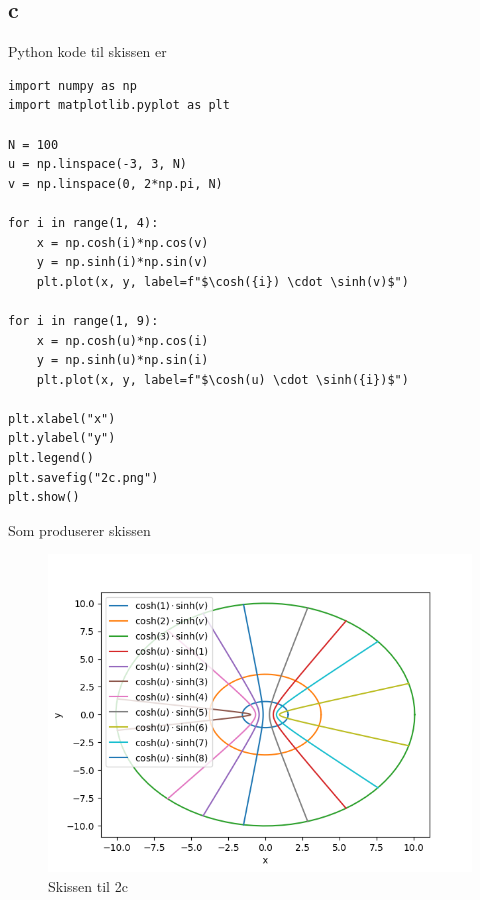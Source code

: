 \documentclass[a4paper,10pt,norsk]{article}
\begin{document}
	\subsection*{c}
	Python kode til skissen er
	\begin{lstlisting}
import numpy as np
import matplotlib.pyplot as plt

N = 100
u = np.linspace(-3, 3, N)
v = np.linspace(0, 2*np.pi, N)

for i in range(1, 4):
    x = np.cosh(i)*np.cos(v)
    y = np.sinh(i)*np.sin(v)
    plt.plot(x, y, label=f"$\cosh({i}) \cdot \sinh(v)$")

for i in range(1, 9):
    x = np.cosh(u)*np.cos(i)
    y = np.sinh(u)*np.sin(i)
    plt.plot(x, y, label=f"$\cosh(u) \cdot \sinh({i})$")

plt.xlabel("x")
plt.ylabel("y")
plt.legend()
plt.savefig("2c.png")
plt.show()
	\end{lstlisting}
	Som produserer skissen
	\begin{figure}[h!]
		\centering
		\caption{Skissen til 2c}
		\label{fig:2c}
		\includegraphics{2c.png}
	\end{figure}
	\newpage	
\end{document}
